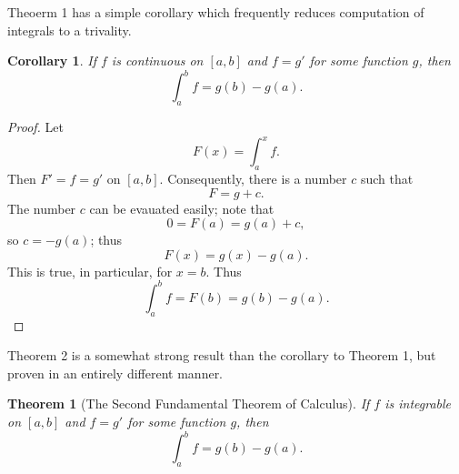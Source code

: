 \documentclass{article}
\newtheorem{corollary}{Corollary}
\newtheorem{theorem}{Theorem}
\begin{document}
Theoerm 1 has a simple corollary which frequently reduces computation of
integrals to a trivality.

\begin{corollary}
  If $f$ is continuous on $[a, b]$ and $f = g'$ for some function $g$, then
  \begin{equation*}
    \int_a^b f = g(b) - g(a).
  \end{equation*}
\end{corollary}

\begin{proof}
  Let \begin{equation*}
    F(x) = \int_a^x f.
  \end{equation*} Then $F' = f = g'$ on $[a, b]$. Consequently, there is a
  number $c$ such that \begin{equation*}
    F = g + c.
  \end{equation*} The number $c$ can be evauated easily; note that
  \begin{equation*}
    0 = F(a) = g(a) + c,
  \end{equation*} so $c = -g(a)$; thus \begin{equation*}
    F(x) = g(x) - g(a).
  \end{equation*} This is true, in particular, for $x = b$. Thus
  \begin{equation*}
    \int_a^b f = F(b) = g(b) - g(a).
  \end{equation*}
\end{proof}

Theorem 2 is a somewhat strong result than the corollary to Theorem 1, but
proven in an entirely different manner.

\begin{theorem}[The Second Fundamental Theorem of Calculus]
  If $f$ is integrable on $[a, b]$ and $f = g'$ for some function $g$, then
  \begin{equation*}
    \int_a^b f = g(b) - g(a).
  \end{equation*}
\end{theorem}
\end{document}
